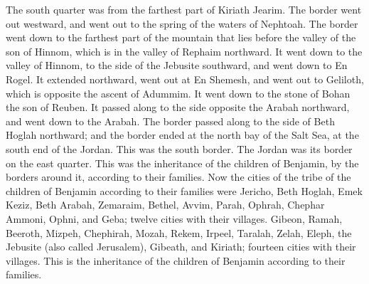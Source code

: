 {The south quarter was from the farthest part of Kiriath Jearim. The border went out westward, and went out to the spring of the waters of Nephtoah.
The border went down to the farthest part of the mountain that lies before the valley of the son of Hinnom, which is in the valley of Rephaim northward. It went down to the valley of Hinnom, to the side of the Jebusite southward, and went down to En Rogel.
It extended northward, went out at En Shemesh, and went out to Geliloth, which is opposite the ascent of Adummim. It went down to the stone of Bohan the son of Reuben.
It passed along to the side opposite the Arabah northward, and went down to the Arabah.
The border passed along to the side of Beth Hoglah northward; and the border ended at the north bay of the Salt Sea, at the south end of the Jordan. This was the south border.
The Jordan was its border on the east quarter. This was the inheritance of the children of Benjamin, by the borders around it, according to their families.
Now the cities of the tribe of the children of Benjamin according to their families were Jericho, Beth Hoglah, Emek Keziz,
Beth Arabah, Zemaraim, Bethel,
Avvim, Parah, Ophrah,
Chephar Ammoni, Ophni, and Geba; twelve cities with their villages.
Gibeon, Ramah, Beeroth,
Mizpeh, Chephirah, Mozah,
Rekem, Irpeel, Taralah,
Zelah, Eleph, the Jebusite (also called Jerusalem), Gibeath, and Kiriath; fourteen cities with their villages. This is the inheritance of the children of Benjamin according to their families.

}
